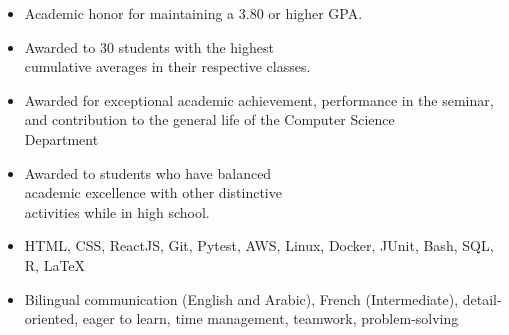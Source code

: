 \documentclass[10pt,a4paper,ragged2e]{altacv}
\begin{document}
\begin{itemize}
  \item Academic honor for maintaining a 3.80 or higher GPA.
\end{itemize}

\begin{itemize}
  \item Awarded to 30 students with the highest \\ cumulative averages in their respective classes.
\end{itemize}

\begin{itemize}
  \item Awarded for exceptional academic achievement, performance in the
        seminar, and contribution to the general life of the Computer Science \\
        Department
\end{itemize}

\begin{itemize}
  \item Awarded to students who have balanced \\ academic excellence with other
        distinctive \\ activities while in high school.
\end{itemize}



\begin{itemize}
  \item HTML, CSS, ReactJS, Git, Pytest, AWS, Linux, Docker, JUnit, Bash, SQL,
        R, \LaTeX

\end{itemize}
\begin{itemize}
  \item Bilingual communication (English and Arabic), French (Intermediate),
        detail-oriented, eager to learn, time management, teamwork, problem-solving

\end{itemize}
\end{document}
